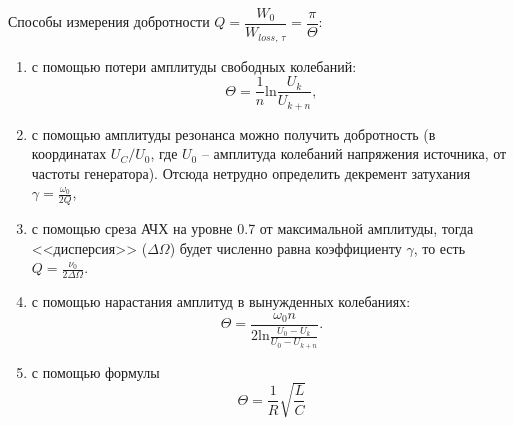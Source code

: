 \documentclass[a4paper, 12pt]{article}
\begin{document}
            Способы измерения добротности $Q = \dfrac{W_0}{W_{loss,\,\tau}} = \dfrac{\pi}{\Theta}$:
            \begin{enumerate}
                \item с помощью потери амплитуды свободных колебаний:
                \begin{equation}
                    \Theta = \frac{1}{n} \text{ln}\frac{U_k}{U_{k+n}},
                \end{equation}
                \item с помощью амплитуды резонанса можно получить добротность (в координатах $U_C/U_0$, где $U_0$ -- амплитуда колебаний напряжения источника, от частоты генератора). Отсюда нетрудно определить декремент затухания $\gamma = \frac{\omega_0}{2Q}$,
                \item с помощью среза АЧХ на уровне 0.7 от максимальной амплитуды, тогда <<дисперсия>> ($\Delta \Omega$) будет численно равна коэффициенту $\gamma$, то есть $Q = \frac{\nu_0}{2 \Delta \Omega}$.
                \item с помощью нарастания амплитуд в вынужденных колебаниях:
                \begin{equation}
                    \Theta = \frac{\omega_0 n}{2\text{ln} \frac{U_0 - U_k}{U_0 - U_{k+n}}}.
                \end{equation}
                \item  с помощью формулы\begin{equation}
                    \Theta = \frac{1}{R}\sqrt{\frac{L}{C}}
                \end{equation}
            \end{enumerate}
\end{document}
